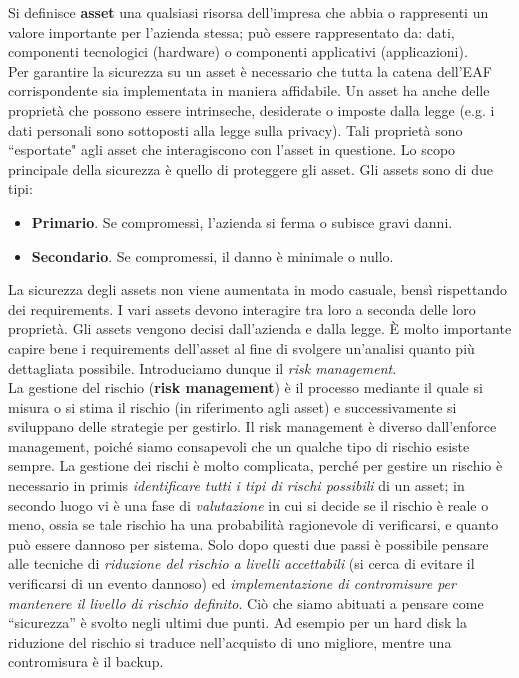 Si definisce \textbf{asset} una qualsiasi risorsa dell'impresa che abbia o rappresenti un valore importante per l'azienda stessa; può essere rappresentato da: dati, componenti tecnologici (hardware) o componenti applicativi (applicazioni).\\
Per garantire la sicurezza su un asset è necessario che tutta la catena dell'EAF corrispondente sia implementata in maniera affidabile. Un asset ha anche delle proprietà che possono essere intrinseche, desiderate o imposte dalla legge (e.g. i dati personali sono sottoposti alla legge sulla privacy). Tali proprietà sono \textquotedblleft esportate" agli asset che interagiscono con l'asset in questione. Lo scopo principale della sicurezza è quello di proteggere gli asset. Gli assets sono di due tipi:
\begin{itemize}
	\item \textbf{Primario}. Se compromessi, l'azienda si ferma o subisce gravi danni.
	\item \textbf{Secondario}. Se compromessi, il danno è minimale o nullo.
\end{itemize}
La sicurezza degli assets non viene aumentata in modo casuale, bensì rispettando dei requirements. I vari assets devono interagire tra loro a seconda delle loro proprietà. Gli assets vengono decisi dall'azienda e dalla legge. È molto importante capire bene i requirements dell'asset al fine di svolgere un'analisi quanto più dettagliata possibile. Introduciamo dunque il \textit{risk management}.\\
La gestione del rischio (\textbf{risk management}) è il processo mediante il quale si misura o si stima il rischio (in riferimento agli asset) e successivamente si sviluppano delle strategie per gestirlo. Il risk management è diverso dall'enforce management, poiché siamo consapevoli che un qualche tipo di rischio esiste sempre. La gestione dei rischi è molto complicata, perché per gestire un rischio è necessario in primis \textit{identificare tutti i tipi di rischi possibili} di un asset; in secondo luogo vi è una fase di \textit{valutazione} in cui si decide se il rischio è reale o meno, ossia se tale rischio ha una probabilità ragionevole di verificarsi, e quanto può essere dannoso per sistema. Solo dopo questi due passi è possibile pensare alle tecniche di \textit{riduzione del rischio a livelli accettabili} (si cerca di evitare il verificarsi di un evento dannoso) ed \textit{implementazione di contromisure per mantenere il livello di rischio definito}. Ciò che siamo abituati a pensare come “sicurezza” è svolto negli ultimi due punti. Ad esempio per un hard disk la riduzione del rischio si traduce nell'acquisto di uno migliore, mentre una contromisura è il backup.

